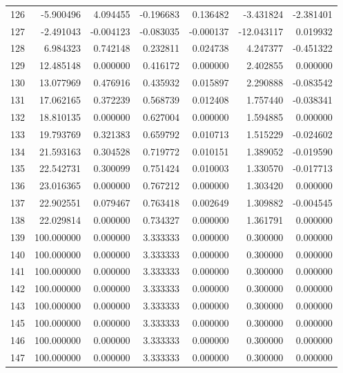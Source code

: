 \begin{tabular}{rrrrrrr}
126 &  -5.900496 &    4.094455 & -0.196683 &   0.136482 &  -3.431824 & -2.381401 \\
127 &  -2.491043 &   -0.004123 & -0.083035 &  -0.000137 & -12.043117 &  0.019932 \\
128 &   6.984323 &    0.742148 &  0.232811 &   0.024738 &   4.247377 & -0.451322 \\
129 &  12.485148 &    0.000000 &  0.416172 &   0.000000 &   2.402855 &  0.000000 \\
130 &  13.077969 &    0.476916 &  0.435932 &   0.015897 &   2.290888 & -0.083542 \\
131 &  17.062165 &    0.372239 &  0.568739 &   0.012408 &   1.757440 & -0.038341 \\
132 &  18.810135 &    0.000000 &  0.627004 &   0.000000 &   1.594885 &  0.000000 \\
133 &  19.793769 &    0.321383 &  0.659792 &   0.010713 &   1.515229 & -0.024602 \\
134 &  21.593163 &    0.304528 &  0.719772 &   0.010151 &   1.389052 & -0.019590 \\
135 &  22.542731 &    0.300099 &  0.751424 &   0.010003 &   1.330570 & -0.017713 \\
136 &  23.016365 &    0.000000 &  0.767212 &   0.000000 &   1.303420 &  0.000000 \\
137 &  22.902551 &    0.079467 &  0.763418 &   0.002649 &   1.309882 & -0.004545 \\
138 &  22.029814 &    0.000000 &  0.734327 &   0.000000 &   1.361791 &  0.000000 \\
139 & 100.000000 &    0.000000 &  3.333333 &   0.000000 &   0.300000 &  0.000000 \\
140 & 100.000000 &    0.000000 &  3.333333 &   0.000000 &   0.300000 &  0.000000 \\
141 & 100.000000 &    0.000000 &  3.333333 &   0.000000 &   0.300000 &  0.000000 \\
142 & 100.000000 &    0.000000 &  3.333333 &   0.000000 &   0.300000 &  0.000000 \\
143 & 100.000000 &    0.000000 &  3.333333 &   0.000000 &   0.300000 &  0.000000 \\
145 & 100.000000 &    0.000000 &  3.333333 &   0.000000 &   0.300000 &  0.000000 \\
146 & 100.000000 &    0.000000 &  3.333333 &   0.000000 &   0.300000 &  0.000000 \\
147 & 100.000000 &    0.000000 &  3.333333 &   0.000000 &   0.300000 &  0.000000 \\

\end{tabular}
